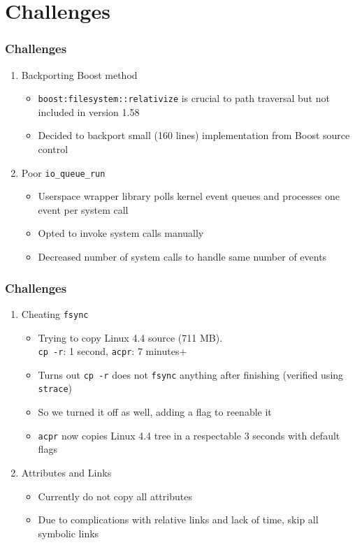 \documentclass{beamer}
\begin{document}
\section{Challenges}
\begin{frame}
    \frametitle{Challenges}
    \begin{enumerate}[1.]
        \item{Backporting Boost method }
            \begin{itemize}
                \item{\texttt{boost:filesystem::relativize} is crucial to path
                        traversal but not included in version 1.58 }
                \item{Decided to backport small (160 lines) implementation from
                        Boost source control }
            \end{itemize}
        \item{Poor \texttt{io\_queue\_run} }
            \begin{itemize}
                \item{Userspace wrapper library polls kernel event queues and processes one event per system call }
                \item{Opted to invoke system calls manually }
                \item{Decreased number of system calls to handle same number of events}
            \end{itemize}
    \end{enumerate}
\end{frame}

\begin{frame}
\frametitle{Challenges}
\begin{enumerate}[1.]
	\item{Cheating \texttt{fsync}}
	\begin{itemize}
		\item{Trying to copy Linux 4.4 source (711 MB). \\ 
			\texttt{cp -r}: 1 second, \texttt{acpr}: 7 minutes+}
		\item{Turns out \texttt{cp -r} does not \texttt{fsync} anything after finishing 
			(verified using \texttt{strace})}
		\item{So we turned it off as well, adding a flag to reenable it}
		\item{\texttt{acpr} now copies Linux 4.4 tree in a respectable 3 seconds with default flags}
	\end{itemize}
	\item{Attributes and Links}
	\begin{itemize}
		\item{Currently do not copy all attributes}
		\item{Due to complications with relative links and lack of time, skip all symbolic links}
	\end{itemize}
	
\end{enumerate}
\end{frame}
\end{document}
